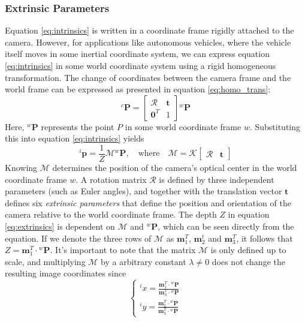 \subsubsection{Extrinsic Parameters}

Equation \ref{eq:intrinsics} is written in a coordinate frame rigidly attached to the camera. However, for applications like autonomous vehicles, where the vehicle itself moves in some inertial coordinate system, we can express equation \ref{eq:intrinsics} in some world coordinate system using a rigid homogeneous transformation. The change of coordinates between the camera frame and the world frame can be expressed as presented in equation \ref{eq:homo_trans}:
\begin{equation}
    ^c\mathbf{P}=\begin{bmatrix}\mathcal{R} & \mathbf{t}\\ \mathbf{0}^T & 1\end{bmatrix} {}^w\mathbf{P}
\end{equation}
Here, $^w\mathbf{P}$ represents the point $P$ in some world coordinate frame $w$. Substituting this into equation \ref{eq:intrinsics} yields
\begin{equation}
\label{eq:extrinsics}
    ^i\mathbf{p}=\frac{1}{Z}\mathcal{M}{}^w\mathbf{P},\quad \text{where}\quad \mathcal{M}=\mathcal{K}\begin{bmatrix}\mathcal{R} & \mathbf{t}\end{bmatrix}
\end{equation}
Knowing $\mathcal{M}$ determines the position of the camera's optical center in the world coordinate frame $w$. A rotation matrix $\mathcal{R}$ is defined by three independent parameters (such as Euler angles), and together with the translation vector $\mathbf{t}$ defines six \textit{extrinsic parameters} that define the position and orientation of the camera relative to the world coordinate frame. The depth $Z$ in equation \ref{eq:extrinsics} is dependent on $\mathcal{M}$ and $^w\mathbf{P}$, which can be seen directly from the equation. If we denote the three rows of $\mathcal{M}$ as $\mathbf{m}_1^T$, $\mathbf{m}_2^t$ and $\mathbf{m}_3^T$, it follows that $Z=\mathbf{m}_1^T\cdot {}^w\mathbf{P}$. It's important to note that the matrix $\mathcal{M}$ is only defined up to scale, and multiplying $\mathcal{M}$ by a arbitrary constant $\lambda\neq0$ does not change the resulting image coordinates since
\begin{equation}
\begin{cases}
    {}^i x=\frac{\mathbf{m}_1^T\cdot {}^w\mathbf{P}}{\mathbf{m}_3^T\cdot {}^w\mathbf{P}}\\
    {}^i y=\frac{\mathbf{m}_2^T\cdot {}^w\mathbf{P}}{\mathbf{m}_3^T\cdot {}^w\mathbf{P}}
\end{cases}
\end{equation}
